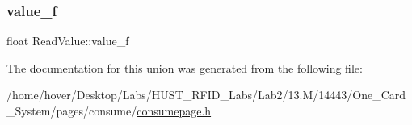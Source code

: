 \mbox{\label{union_read_value_aaf8c28a424fb6f23198e7a18b87785c9}} 
\subsubsection{\texorpdfstring{value\_f}{value\_f}}
{\footnotesize\ttfamily float Read\+Value\+::value\+\_\+f}



The documentation for this union was generated from the following file\+:\begin{DoxyCompactItemize}
\item 
/home/hover/\+Desktop/\+Labs/\+H\+U\+S\+T\+\_\+\+R\+F\+I\+D\+\_\+\+Labs/\+Lab2/13.\+M/14443/\+One\+\_\+\+Card\+\_\+\+System/pages/consume/\mbox{\hyperlink{consumepage_8h}{consumepage.\+h}}\end{DoxyCompactItemize}
